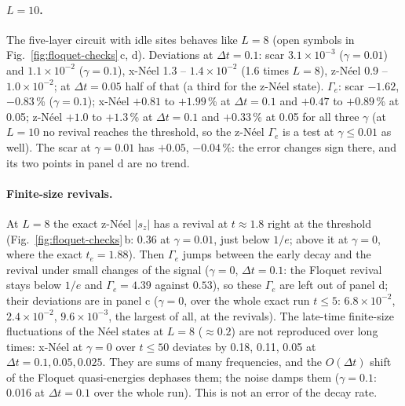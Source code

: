 \paragraph{$L = 10$.} The five-layer circuit with idle sites behaves like $L = 8$ (open symbols in Fig.~\ref{fig:floquet-checks}\,c, d). Deviations at $\Delta t = 0.1$: scar $3.1\times10^{-3}$ ($\gamma = 0.01$) and $1.1\times10^{-2}$ ($\gamma = 0.1$), x-Néel 1.3 -- $1.4\times10^{-2}$ (1.6 times $L = 8$), z-Néel 0.9 -- $1.0\times10^{-2}$; at $\Delta t = 0.05$ half of that (a third for the z-Néel state). $\Gamma_e$: scar $-1.62$, $-0.83$\,\% ($\gamma = 0.1$); x-Néel $+0.81$ to $+1.99$\,\% at $\Delta t = 0.1$ and $+0.47$ to $+0.89$\,\% at 0.05; z-Néel $+1.0$ to $+1.3$\,\% at $\Delta t = 0.1$ and $+0.33$\,\% at 0.05 for all three $\gamma$ (at $L = 10$ no revival reaches the threshold, so the z-Néel $\Gamma_e$ is a test at $\gamma \le 0.01$ as well). The scar at $\gamma = 0.01$ has $+0.05$, $-0.04$\,\%: the error changes sign there, and its two points in panel d are no trend.

\paragraph{Finite-size revivals.} At $L = 8$ the exact z-Néel $|s_z|$ has a revival at $t \approx 1.8$ right at the threshold (Fig.~\ref{fig:floquet-checks}\,b: 0.36 at $\gamma = 0.01$, just below $1/e$; above it at $\gamma = 0$, where the exact $t_e = 1.88$). Then $\Gamma_e$ jumps between the early decay and the revival under small changes of the signal ($\gamma = 0$, $\Delta t = 0.1$: the Floquet revival stays below $1/e$ and $\Gamma_e = 4.39$ against $0.53$), so these $\Gamma_e$ are left out of panel d; their deviations are in panel c ($\gamma = 0$, over the whole exact run $t \le 5$: $6.8\times10^{-2}$, $2.4\times10^{-2}$, $9.6\times10^{-3}$, the largest of all, at the revivals). The late-time finite-size fluctuations of the Néel states at $L = 8$ ($\approx 0.2$) are not reproduced over long times: x-Néel at $\gamma = 0$ over $t \le 50$ deviates by 0.18, 0.11, 0.05 at $\Delta t = 0.1, 0.05, 0.025$. They are sums of many frequencies, and the $O(\Delta t)$ shift of the Floquet quasi-energies dephases them; the noise damps them ($\gamma = 0.1$: 0.016 at $\Delta t = 0.1$ over the whole run). This is not an error of the decay rate.

